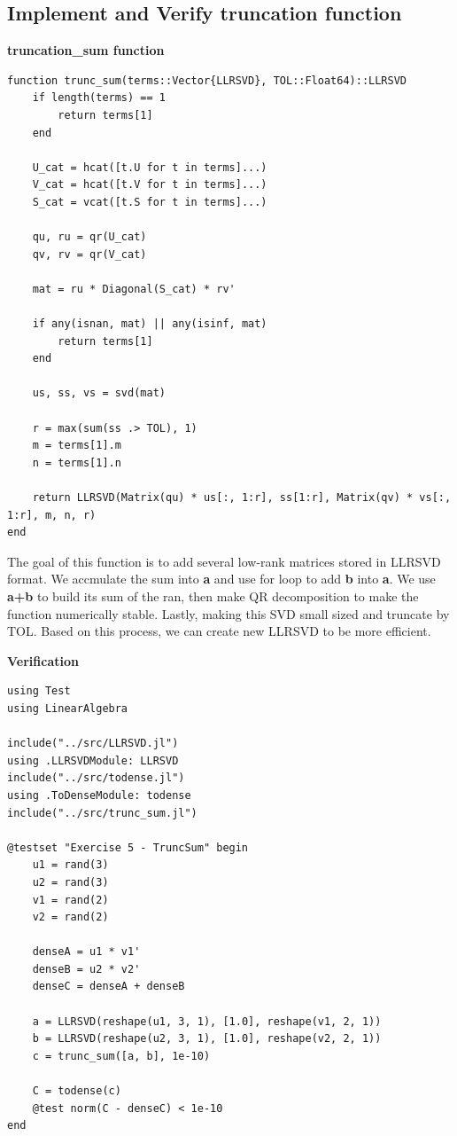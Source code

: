\documentclass[11pt]{report}
\begin{document}
\subsection{Implement and Verify truncation function}

\textbf{truncation\_sum function}

\begin{lstlisting}
function trunc_sum(terms::Vector{LLRSVD}, TOL::Float64)::LLRSVD
    if length(terms) == 1
        return terms[1]
    end

    U_cat = hcat([t.U for t in terms]...)
    V_cat = hcat([t.V for t in terms]...)
    S_cat = vcat([t.S for t in terms]...)

    qu, ru = qr(U_cat)
    qv, rv = qr(V_cat)

    mat = ru * Diagonal(S_cat) * rv'

    if any(isnan, mat) || any(isinf, mat)
        return terms[1]
    end

    us, ss, vs = svd(mat)

    r = max(sum(ss .> TOL), 1)
    m = terms[1].m
    n = terms[1].n

    return LLRSVD(Matrix(qu) * us[:, 1:r], ss[1:r], Matrix(qv) * vs[:, 1:r], m, n, r)
end
\end{lstlisting}

The goal of this function is to add several low-rank matrices stored in LLRSVD format. We accmulate the sum into \textbf{a} and use for loop to add \textbf{b} into \textbf{a}. We use \textbf{a+b}  to build its sum of the ran, then make QR decomposition to make the function numerically stable. Lastly, making this SVD small sized and truncate by TOL. Based on this process, we can create new LLRSVD to be more efficient. 

\textbf{Verification}

\begin{lstlisting}
using Test
using LinearAlgebra

include("../src/LLRSVD.jl")
using .LLRSVDModule: LLRSVD
include("../src/todense.jl")
using .ToDenseModule: todense
include("../src/trunc_sum.jl")

@testset "Exercise 5 - TruncSum" begin
    u1 = rand(3)
    u2 = rand(3)
    v1 = rand(2)
    v2 = rand(2)
    
    denseA = u1 * v1'
    denseB = u2 * v2'
    denseC = denseA + denseB

    a = LLRSVD(reshape(u1, 3, 1), [1.0], reshape(v1, 2, 1))
    b = LLRSVD(reshape(u2, 3, 1), [1.0], reshape(v2, 2, 1))
    c = trunc_sum([a, b], 1e-10)

    C = todense(c)
    @test norm(C - denseC) < 1e-10
end
\end{lstlisting}
\end{document}
